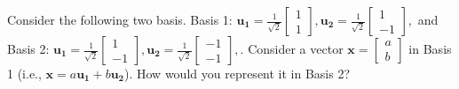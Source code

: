 \documentclass[solution,addpoints,12pt]{exam}
\begin{document}
\begin{questions}


\question[2] Consider the following two basis. Basis 1: $\mathbf{u_1} = \frac{1}{\sqrt{2}}\begin{bmatrix} 1 \\ 1 \end{bmatrix}, \mathbf{u_2} = \frac{1}{\sqrt{2}}\begin{bmatrix} 1 \\ -1 \end{bmatrix},$ and Basis 2: $\mathbf{u_1} = \frac{1}{\sqrt{2}}\begin{bmatrix} 1 \\ -1 \end{bmatrix}, \mathbf{u_2} = \frac{1}{\sqrt{2}}\begin{bmatrix} -1 \\ -1 \end{bmatrix},$. Consider a vector $\mathbf{x} = \begin{bmatrix} a \\ b \end{bmatrix}$ in Basis 1 (i.e., $\mathbf{x} = a \mathbf{u_1} + b \mathbf{u_2}$). How would you represent it in Basis 2?
\begin{solution}


\end{solution}
\end{questions}
\end{document}
